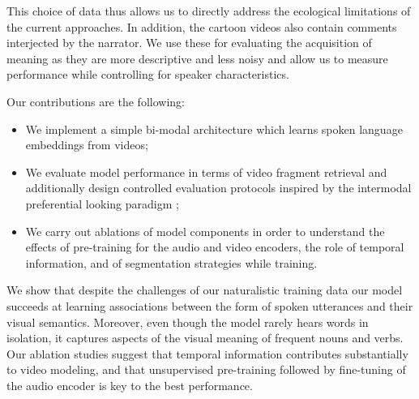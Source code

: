 This choice of data thus allows us to directly address the ecological limitations 
of the current approaches. In addition, the cartoon videos also contain 
comments interjected by the narrator. We use these for evaluating the 
acquisition of meaning as they are more descriptive and less noisy and allow 
us to measure performance while controlling for speaker characteristics.


Our contributions are the following:
\begin{itemize}
\item We implement a simple bi-modal architecture which learns
  spoken language embeddings from videos;
\item We evaluate model performance in terms of video fragment
  retrieval and additionally design controlled evaluation
  protocols inspired by the intermodal preferential looking
  paradigm \citep{hirsh1996intermodal};
\item We carry out ablations of model components in order to
  understand the effects of pre-training for the audio and video
  encoders, the role of temporal information, and of segmentation
  strategies while training. 
\end{itemize}
We show that despite the challenges of our naturalistic training data
our model succeeds at learning associations between the form of spoken 
utterances and their visual semantics. Moreover, even though the model 
rarely hears words in isolation, it captures aspects of the visual meaning 
of frequent nouns and verbs.
%
Our ablation studies suggest that temporal information contributes
substantially to video modeling, and that unsupervised pre-training
followed by fine-tuning of the audio encoder is key to the best
performance.



